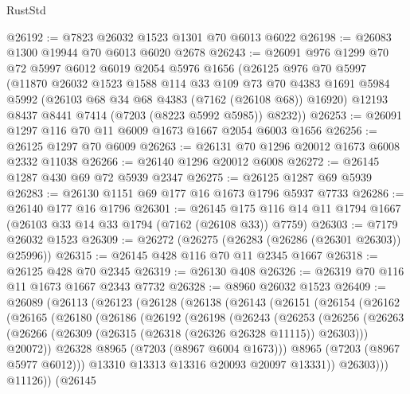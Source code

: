 \begin{lexlean}{RustStd}
\begin{coremodule}
@26192 := @7823 @26032 @1523 @1301 @70 @6013 @6022
@26198 := @26083 @1300 @19944 @70 @6013 @6020 @2678
@26243 := @26091
    @976
    @1299
    @70
    @72
    @5997
    @6012
    @6019
    @2054
    @5976
    @1656
    (@26125
      @976
      @70
      @5997
      (@11870
        @26032
        @1523
        @1588
        @114
        @33
        @109
        @73
        @70
        @4383
        @1691
        @5984
        @5992
        (@26103 @68 @34 @68 @4383 (@7162 (@26108 @68)) @16920)
        @12193
        @8437
        @8441
        @7414
        (@7203 (@8223 @5992 @5985))
        @8232))
@26253 := @26091 @1297 @116 @70 @11 @6009 @1673 @1667 @2054 @6003 @1656
@26256 := @26125 @1297 @70 @6009
@26263 := @26131 @70 @1296 @20012 @1673 @6008 @2332 @11038
@26266 := @26140 @1296 @20012 @6008
@26272 := @26145 @1287 @430 @69 @72 @5939 @2347
@26275 := @26125 @1287 @69 @5939
@26283 := @26130 @1151 @69 @177 @16 @1673 @1796 @5937 @7733
@26286 := @26140 @177 @16 @1796
@26301 := @26145 @175 @116 @14 @11 @1794 @1667 (@26103 @33 @14 @33 @1794 (@7162 (@26108 @33)) @7759)
@26303 := @7179 @26032 @1523
@26309 := @26272 (@26275 (@26283 (@26286 (@26301 @26303)) @25996))
@26315 := @26145 @428 @116 @70 @11 @2345 @1667
@26318 := @26125 @428 @70 @2345
@26319 := @26130 @408
@26326 := @26319 @70 @116 @11 @1673 @1667 @2343 @7732
@26328 := @8960 @26032 @1523
@26409 := @26089
    (@26113
      (@26123
        (@26128
          (@26138
            (@26143
              (@26151
                (@26154
                  (@26162
                    (@26165
                      (@26180
                        (@26186
                          (@26192
                            (@26198
                              (@26243
                                (@26253
                                  (@26256
                                    (@26263
                                      (@26266
                                        (@26309 (@26315 (@26318 (@26326 @26328 @11115)) @26303)))
                                      @20072))
                                  @26328
                                  @8965
                                  (@7203 (@8967 @6004 @1673)))
                                @8965
                                (@7203 (@8967 @5977 @6012)))
                              @13310
                              @13313
                              @13316
                              @20093
                              @20097
                              @13331))
                          @26303)))
                    @11126))
                (@26145

\end{coremodule}
\end{lexlean}
